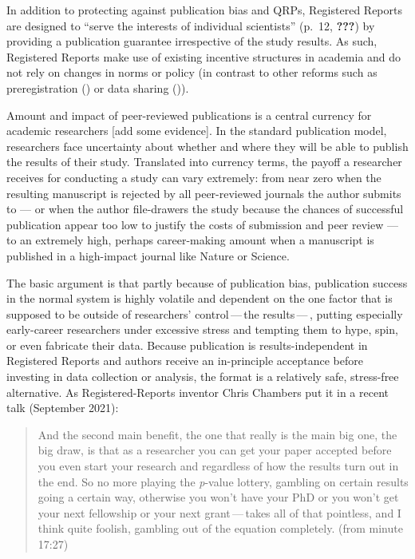 \documentclass[british,,man,floatsintext]{apa6}
\begin{document}
In addition to protecting against publication bias and QRPs, Registered Reports are designed to \enquote{serve the interests of individual scientists} (p.~12, {\textbf{???}}) by providing a publication guarantee irrespective of the study results.
As such, Registered Reports make use of existing incentive structures in academia and do not rely on changes in norms or policy (in contrast to other reforms such as preregistration () or data sharing ()).

Amount and impact of peer-reviewed publications is a central currency for academic researchers {[}add some evidence{]}. In the standard publication model, researchers face uncertainty about whether and where they will be able to publish the results of their study. Translated into currency terms, the payoff a researcher receives for conducting a study can vary extremely: from near zero when the resulting manuscript is rejected by all peer-reviewed journals the author submits to --- or when the author file-drawers the study because the chances of successful publication appear too low to justify the costs of submission and peer review --- to an extremely high, perhaps career-making amount when a manuscript is published in a high-impact journal like Nature or Science.

The basic argument is that partly because of publication bias, publication success in the normal system is highly volatile and dependent on the one factor that is supposed to be outside of researchers' control\(\,\)---\(\,\)the results\(\,\)---\(\,\), putting especially early-career researchers under excessive stress and tempting them to hype, spin, or even fabricate their data.
Because publication is results-independent in Registered Reports and authors receive an in-principle acceptance before investing in data collection or analysis, the format is a relatively safe, stress-free alternative.
As Registered-Reports inventor Chris Chambers put it in a recent talk (September 2021):

\begin{quote}
And the second main benefit, the one that really is the main big one, the big draw, is that as a researcher you can get your paper accepted before you even start your research and regardless of how the results turn out in the end. So no more playing the \emph{p}-value lottery, gambling on certain results going a certain way, otherwise you won't have your PhD or you won't get your next fellowship or your next grant\(\,\)---\(\,\)takes all of that pointless, and I think quite foolish, gambling out of the equation completely. (from minute 17:27)
\end{quote}
\end{document}
